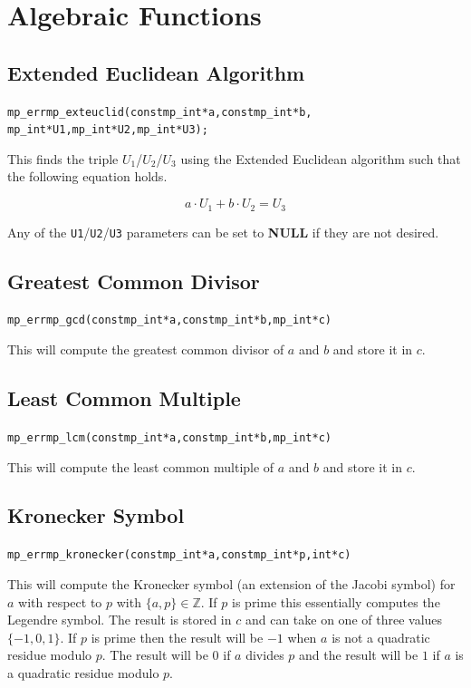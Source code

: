 \documentclass[synpaper]{book}
\begin{document}
\chapter{Algebraic Functions}
\section{Extended Euclidean Algorithm}
\begin{alltt}
mp_err mp_exteuclid(const mp_int *a, const mp_int *b,
                 mp_int *U1, mp_int *U2, mp_int *U3);
\end{alltt}

This finds the triple $U_1$/$U_2$/$U_3$ using the Extended Euclidean algorithm such that the
following equation holds.

\begin{equation}
  a \cdot U_1 + b \cdot U_2 = U_3
\end{equation}

Any of the \texttt{U1}/\texttt{U2}/\texttt{U3} parameters can be set to \textbf{NULL} if they are
not desired.

\section{Greatest Common Divisor}
\begin{alltt}
mp_err mp_gcd (const mp_int *a, const mp_int *b, mp_int *c)
\end{alltt}
This will compute the greatest common divisor of $a$ and $b$ and store it in $c$.

\section{Least Common Multiple}
\begin{alltt}
mp_err mp_lcm (const mp_int *a, const mp_int *b, mp_int *c)
\end{alltt}
This will compute the least common multiple of $a$ and $b$ and store it in $c$.

\section{Kronecker Symbol}
\begin{alltt}
mp_err mp_kronecker (const mp_int *a, const mp_int *p, int *c)
\end{alltt}
This will compute the Kronecker symbol (an extension of the Jacobi symbol) for $a$ with respect to
$p$ with $\lbrace a, p \rbrace \in \mathbb{Z}$.  If $p$ is prime this essentially computes the
Legendre symbol. The result is stored in $c$ and can take on one of three values $\lbrace -1, 0, 1
  \rbrace$.  If $p$ is prime then the result will be $-1$ when $a$ is not a quadratic residue
modulo
$p$.  The result will be $0$ if $a$ divides $p$ and the result will be $1$ if $a$ is a quadratic
residue modulo $p$.
\end{document}
